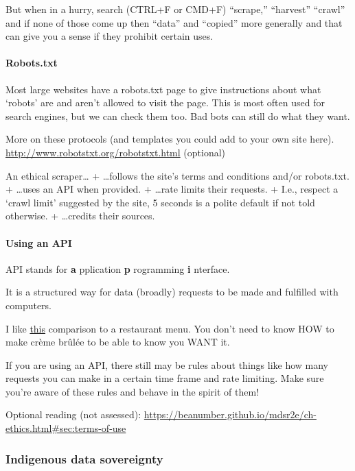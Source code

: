\documentclass[
  openany]{book}
\begin{document}
But when in a hurry, search (CTRL+F or CMD+F) ``scrape,'' ``harvest'' ``crawl'' and if none of those come up then ``data'' and ``copied'' more generally and that can give you a sense if they prohibit certain uses.

\hypertarget{robots.txt}{%
\paragraph{Robots.txt}\label{robots.txt}}

Most large websites have a robots.txt page to give instructions about what `robots' are and aren't allowed to visit the page. This is most often used for search engines, but we can check them too. Bad bots can still do what they want.

More on these protocols (and templates you could add to your own site here).
\url{http://www.robotstxt.org/robotstxt.html} (optional)

An ethical scraper\ldots{}
+ \ldots follows the site's terms and conditions and/or robots.txt.
+ \ldots uses an API when provided.
+ \ldots rate limits their requests.
+ I.e., respect a `crawl limit' suggested by the site, 5 seconds is a polite default if not told otherwise.
+ \ldots credits their sources.

\hypertarget{using-an-api}{%
\paragraph{Using an API}\label{using-an-api}}

API stands for \textbf{a} pplication \textbf{p} rogramming \textbf{i} nterface.

It is a structured way for data (broadly) requests to be made and fulfilled with computers.

I like \href{https://www.howtogeek.com/343877/what-is-an-api/}{this} comparison to a restaurant menu. You don't need to know HOW to make crème brûlée to be able to know you WANT it.

If you are using an API, there still may be rules about things like how many requests you can make in a certain time frame and rate limiting. Make sure you're aware of these rules and behave in the spirit of them!

Optional reading (not assessed): \url{https://beanumber.github.io/mdsr2e/ch-ethics.html\#sec:terms-of-use}

\hypertarget{indigenous-data-sovereignty}{%
\subsubsection{Indigenous data sovereignty}\label{indigenous-data-sovereignty}}
\end{document}
